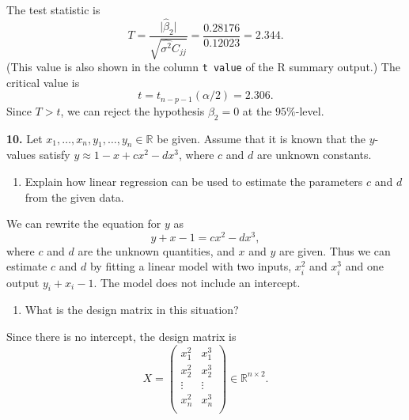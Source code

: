 \documentclass[
  a4paper,
]{article}
\providecommand{\tightlist}{%
  \setlength{\itemsep}{0pt}\setlength{\parskip}{0pt}}
\theoremstyle{definition}
\theoremstyle{definition}
\theoremstyle{definition}
\theoremstyle{definition}
\theoremstyle{remark}
\begin{document}
\begin{myanswers}
The test statistic is
\begin{equation*}
  T
  = \frac{\bigl|\hat\beta_2\bigr|}{\sqrt{\widehat{\sigma^2} C_{jj}} }
  = \frac{0.28176}{0.12023}
  = 2.344.
\end{equation*}
(This value is also shown in the column \texttt{t\ value} of the R
summary output.) The critical value is
\begin{equation*}
  t
  = t_{n-p-1}(\alpha/2)
  = 2.306.
\end{equation*}
Since \(T > t\), we can reject the hypothesis \(\beta_2 = 0\) at the
\(95\%\)-level.

\end{myanswers}

\textbf{10.} Let \(x_1, \ldots, x_n, y_1, \ldots, y_n \in \mathbb{R}\) be given. Assume
that it is known that the \(y\)-values satisfy
\(y \approx 1 - x + c x^2 - d x^3\), where \(c\) and \(d\) are unknown
constants.

\begin{enumerate}
\def\labelenumi{\alph{enumi}.}
\tightlist
\item
  Explain how linear regression can be used to estimate the
  parameters \(c\) and \(d\) from the given data.
\end{enumerate}

\begin{myanswers}
We can rewrite the equation for \(y\) as
\begin{equation*}
  y + x - 1 = c x^2 - d x^3,
\end{equation*}
where \(c\) and \(d\) are the unknown quantities, and \(x\) and \(y\)
are given. Thus we can estimate \(c\) and \(d\) by fitting
a linear model with two inputs, \(x_i^2\) and \(x_i^3\)
and one output \(y_i + x_i - 1\). The model does not include
an intercept.

\end{myanswers}

\begin{enumerate}
\def\labelenumi{\alph{enumi}.}
\setcounter{enumi}{1}
\tightlist
\item
  What is the design matrix in this situation?
\end{enumerate}

\begin{myanswers}
Since there is no intercept, the design matrix is
\begin{equation*}
  X = \begin{pmatrix}
    x_1^2 & x_1^3 \\
    x_2^2 & x_2^3 \\
    \vdots & \vdots \\
    x_n^2 & x_n^3 \\
  \end{pmatrix}
  \in \mathbb{R}^{n\times 2}.
\end{equation*}

\end{myanswers}
\end{document}

